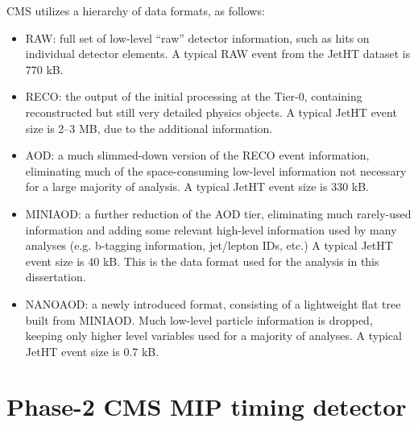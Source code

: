 CMS utilizes a hierarchy of data formats, as follows:
\vspace{-2mm}
\begin{itemize}\setlength\itemsep{-1mm}
\item {RAW}: full set of low-level ``raw'' detector information, such as hits on individual detector elements.
A typical {RAW} event from the JetHT dataset is 770 kB.
\item {RECO}: the output of the initial processing at the Tier-0, containing reconstructed but still very detailed physics objects.
A typical JetHT event size is 2--3 MB, due to the additional information.
\item {AOD}: a much slimmed-down version of the {RECO} event information, eliminating much of
the space-consuming low-level information not necessary for a large majority of analysis. A typical JetHT event
size is 330 kB.
\item {MINIAOD}: a further reduction of the {AOD} tier, eliminating much rarely-used information
and adding some relevant high-level information used by many analyses (e.g. b-tagging information, jet/lepton IDs, etc.)
A typical JetHT event size is 40 kB. This is the data format used for the analysis in this dissertation.
\item NANOAOD: a newly introduced format, consisting of a lightweight flat tree built from MINIAOD. Much low-level
particle information is dropped, keeping only higher level variables used for a majority of analyses.
A typical JetHT event size is 0.7 kB.
\end{itemize}

\section{Phase-2 CMS MIP timing detector}



